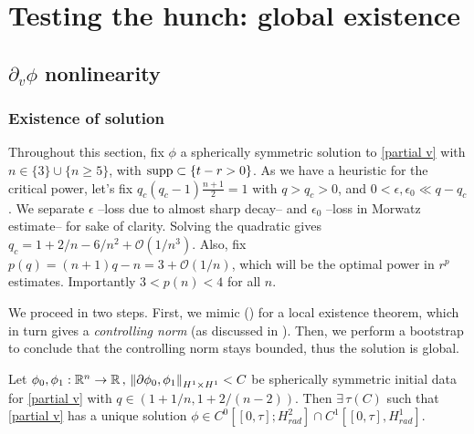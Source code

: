 \documentclass[11pt, oneside]{amsart}
\begin{document}
	
	\section{Testing the hunch: global existence}
	\subsection{$\partial_v\phi$ nonlinearity}
	\subsubsection{Existence of solution}
	Throughout this section, fix $\phi$ a spherically symmetric solution to \eqref{partial v} with $n\in\{3\}\cup\{n\geq5\}$, with $\operatorname{supp}\subset\{t-r>0\}$. As we have a heuristic for the critical power, let's fix $q_c(q_c-1)\frac{n+1}{2}=1$ with $q>q_c>0$, and $0<\epsilon,\epsilon_0\ll q-q_c$. We separate $\epsilon$  --loss due to almost sharp decay--  and $\epsilon_0$ --loss in Morwatz estimate-- for sake of clarity. Solving the quadratic gives $q_c=1+2/n-6/n^2+\mathcal{O}(1/n^3)$. Also, fix $p(q)=(n+1)q-n=3+\mathcal{O}(1/n)$, which will be the optimal power in $r^p$ estimates. Importantly $3<p(n)<4$ for all $n$. 
	
	
	We proceed in two steps. First, we mimic (\cite{hidano_glassey_2012}) for a local existence theorem, which in turn gives a \textit{controlling norm} (as discussed in \cite{tao_nonlinear_2006}). Then, we perform a bootstrap to conclude that the controlling norm stays bounded, thus the solution is global.
	
	\begin{theorem}
	Let $\phi_0,\phi_1:\mathbb{R}^n\to\mathbb{R}\, ,\, \left\lVert \partial\phi_0,\phi_1\right\rVert_{H^1\times H^1}<C$ be spherically symmetric initial data for \eqref{partial v} with $q\in(1+1/n,1+2/(n-2))$. Then $\exists\, \tau(C)$ such that \eqref{partial v} has a unique solution  $\phi\in C^0[[0,\tau];H_{rad}^2]\cap C^1[[0,\tau],H_{rad}^1]$.
	\end{theorem}
\end{document}
